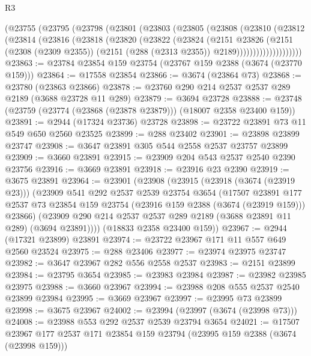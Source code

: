 \begin{lexlean}{R3}
\begin{coremodule}
        (@23755
          (@23795
            (@23798
              (@23801
                (@23803
                  (@23805
                    (@23808
                      (@23810
                        (@23812
                          (@23814
                            (@23816
                              (@23818
                                (@23820
                                  (@23822
                                    (@23824
                                      (@2151
                                        @23826
                                        (@2151
                                          (@2308 (@2309 @2355))
                                          (@2151 (@288 (@2313 @2355)) @2189))))))))))))))))))))
@23863 := @23784 @23854 @159 @23754 (@23767 @159 @2388 (@3674 (@23770 @159)))
@23864 := @17558 @23854
@23866 := @3674 (@23864 @73)
@23868 := @23780 (@23863 @23866)
@23878 := @23760 @290 @214 @2537 @2537 @289 @2189 (@3688 @23728 @11 @289)
@23879 := @3694 @23728
@23888 := @23748 (@23759 (@23774 (@23868 (@23878 @23879))) (@18007 @2358 @23400 @159))
@23891 := @2944 (@17324 @23736) @23728
@23898 := @23722 @23891 @73 @11 @549 @650 @2560 @23525
@23899 := @288 @23402
@23901 := @23898 @23899 @23747
@23908 := @3647 @23891 @305 @544 @2558 @2537 @23757 @23899
@23909 := @3660 @23891
@23915 := @23909 @204 @543 @2537 @2540 @2390 @23756
@23916 := @3669 @23891
@23918 := @23916 @23 @2390
@23919 := @3675 @23891
@23964 := @23901
    (@23908
      (@23915
        (@23918 (@3674 (@23919 @23)))
        (@23909
          @541
          @292
          @2537
          @2539
          @23754
          @3654
          (@17507
            @23891
            @177
            @2537
            @73
            @23854
            @159
            @23754
            (@23916 @159 @2388 (@3674 (@23919 @159)))
            @23866)
          (@23909 @290 @214 @2537 @2537 @289 @2189 (@3688 @23891 @11 @289) (@3694 @23891))))
      (@18833 @2358 @23400 @159))
@23967 := @2944 (@17321 @23899) @23891
@23974 := @23722 @23967 @171 @11 @557 @649 @2560 @23524
@23975 := @288 @23406
@23977 := @23974 @23975 @23747
@23982 := @3647 @23967 @282 @556 @2558 @2537
@23983 := @2151 @23899
@23984 := @23795 @3654
@23985 := @23983 @23984
@23987 := @23982 @23985 @23975
@23988 := @3660 @23967
@23994 := @23988 @208 @555 @2537 @2540 @23899 @23984
@23995 := @3669 @23967
@23997 := @23995 @73 @23899
@23998 := @3675 @23967
@24002 := @23994 (@23997 (@3674 (@23998 @73)))
@24008 := @23988 @553 @292 @2537 @2539 @23794 @3654
@24021 := @17507 @23967 @177 @2537 @171 @23854 @159 @23794 (@23995 @159 @2388 (@3674 (@23998 @159)))

\end{coremodule}
\end{lexlean}
